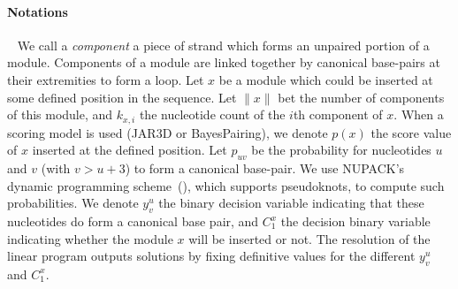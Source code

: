 \documentclass{bioinfo}
\begin{document}
\begin{methods}
\paragraph{Notations} ~ We call a \textit{component} a piece of strand which forms an unpaired portion of a module. Components of a module are linked together by canonical base-pairs at their extremities to form a loop. Let $x$ be a module which could be inserted at some defined position in the sequence. Let $\|x\|$ bet the number of components of this module, and $k_{x,i}$ the nucleotide count of the $i$th component of $x$. When a scoring model is used (JAR3D or BayesPairing), we denote $p(x)$ the score value of $x$ inserted at the defined position. Let $p_{uv}$ be the probability for nucleotides $u$ and $v$ (with $v>u+3$) to form a canonical base-pair. We use NUPACK's dynamic programming scheme~(\citealp{dirksAlgorithmComputingNucleic2004}), which supports pseudoknots, to compute such probabilities. We denote $y^u_v$ the binary decision variable indicating that these nucleotides do form a canonical base pair, and $C^x_1$ the decision binary variable indicating whether the module $x$ will be inserted or not. The resolution of the linear program outputs solutions by fixing definitive values for the different $y^u_v$ and $C^x_1$. 


\end{methods}
\end{document}
